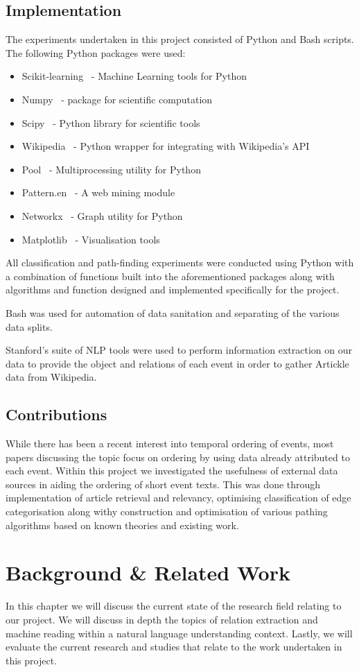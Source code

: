 \documentclass[bsc,frontabs,twoside,singlespacing,parskip,deptreport]{infthesis}     %
\begin{document}
\section{Implementation}
The experiments undertaken in this project consisted of Python and Bash scripts.
The following Python packages were used:
\begin{itemize}
\item Scikit-learning~\cite{scikit-learn} - Machine Learning tools for Python
\item Numpy~\cite{numpy} - package for scientific computation
\item Scipy~\cite{scipy} - Python library for scientific tools
\item Wikipedia~\cite{wikipediaAPI} - Python wrapper for integrating with Wikipedia's API
\item Pool~\cite{pool} - Multiprocessing utility for Python
\item Pattern.en~\cite{pattern} - A web mining module 
\item Networkx~\cite{networkx} - Graph utility for Python
\item Matplotlib~\cite{matplotlib} - Visualisation tools
\end{itemize}
All classification and path-finding experiments were conducted using Python with a combination of
functions built into the aforementioned packages along with algorithms and function designed and implemented
specifically for the project.

Bash was used for automation of data sanitation and separating of the various data splits. 

Stanford's suite of NLP tools were used to perform information extraction on our data to provide the
object and relations of each event in order to gather Artickle data from Wikipedia.
\section{Contributions}
While there has been a recent interest into temporal ordering of events, most papers discussing the topic focus on
ordering by using data already attributed to each event. Within this project we investigated the usefulness of
external data sources in aiding the ordering of short event texts. This was done through implementation
of article retrieval and relevancy, optimising classification of edge categorisation along withy construction and optimisation
of various pathing algorithms based on known theories and existing work. 
\chapter{Background \& Related Work}
In this chapter we will discuss the current state of the research field relating to our project.
We will discuss in depth the topics of relation extraction and machine reading within a natural language understanding
context. Lastly, we will evaluate the current research and studies that relate to the work undertaken in this project.
\end{document}
